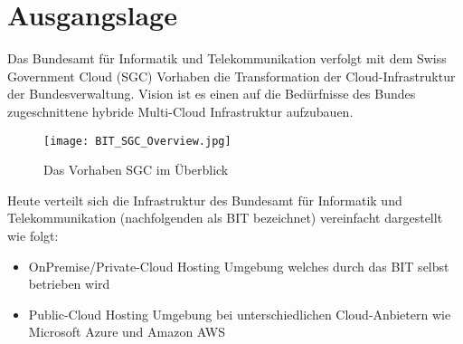 \section{Ausgangslage}

Das Bundesamt für Informatik und Telekommunikation verfolgt mit dem Swiss Government Cloud (SGC) Vorhaben die Transformation der Cloud-Infrastruktur der Bundesverwaltung. Vision ist es einen auf die Bedürfnisse des Bundes zugeschnittene hybride Multi-Cloud Infrastruktur aufzubauen.

\begin{figure}[H]
    \begin{center}
        \texttt{[image: BIT\_SGC\_Overview.jpg]}
    \end{center}
\caption{Das Vorhaben SGC im Überblick}
\label{fig:sgc_overview}
\end{figure}

Heute verteilt sich die Infrastruktur des Bundesamt für Informatik und Telekommunikation (nachfolgenden als BIT bezeichnet) vereinfacht dargestellt wie folgt:

\begin{itemize}
\item OnPremise/Private-Cloud Hosting Umgebung welches durch das BIT selbst betrieben wird
\item Public-Cloud Hosting Umgebung bei unterschiedlichen Cloud-Anbietern wie Microsoft Azure und Amazon AWS
\end{itemize}
